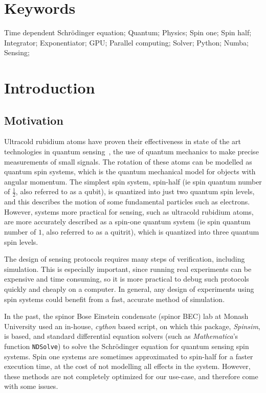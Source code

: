\documentclass{jors}
\begin{document}
\section{Keywords}
Time dependent Schr\"odinger equation; Quantum; Physics; Spin one; Spin half; Integrator; Exponentiator; GPU; Parallel computing; Solver; Python; Numba; Sensing;

\section{Introduction}
\subsection{Motivation}
	Ultracold rubidium atoms have proven their effectiveness in state of the art technologies in quantum sensing~\cite{degen_quantum_2017}, the use of quantum mechanics to make precise measurements of small signals.
	The rotation of these atoms can be modelled as quantum spin systems, which is the quantum mechanical model for objects with angular momentum.
	The simplest spin system, spin-half (ie spin quantum number of $ \frac12 $, also referred to as a qubit), is quantized into just two quantum spin levels, and this describes the motion of some fundamental particles such as electrons.
	However, systems more practical for sensing, such as ultracold rubidium atoms, are more accurately described as a spin-one quantum system (ie spin quantum number of $ 1 $, also referred to as a quitrit), which is quantized into three quantum spin levels.
	
	The design of sensing protocols requires many steps of verification, including simulation.
	This is especially important, since running real experiments can be expensive and time consuming, so it is more practical to debug such protocols quickly and cheaply on a computer.
	In general, any design of experiments using spin systems could benefit from a fast, accurate method of simulation.

	In the past, the spinor Bose Einstein condensate (spinor BEC) lab at Monash University used an in-house, \emph{cython} based script, on which this package, \emph{Spinsim}, is based, and standard differential equation solvers (such as \emph{Mathematica}'s~\cite{wolfram_research_inc_mathematica_2020} function \texttt{NDSolve}) to solve the Schr\"odinger equation for quantum sensing spin systems.
	Spin one systems are sometimes approximated to spin-half for a faster execution time, at the cost of not modelling all effects in the system.
	However, these methods are not completely optimized for our use-case, and therefore come with some issues.
\end{document}
